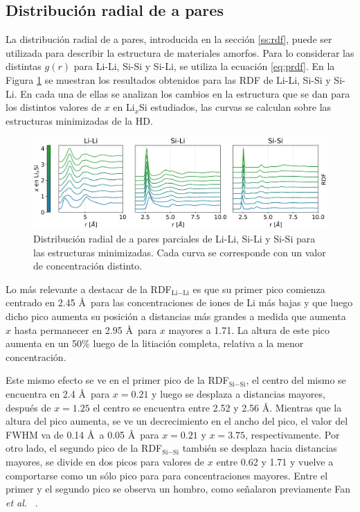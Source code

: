 \subsection{Distribución radial de a pares}

La distribución radial de a pares, introducida en la sección \ref{ss:rdf},
puede ser utilizada para describir la estructura de materiales amorfos. Para lo 
considerar las distintas $g(r)$ para Li-Li, Si-Si y Si-Li, se utiliza la 
ecuación \ref{eq:prdf}. En la Figura \ref{fig:rdf} se muestran los resultados 
obtenidos para las RDF de Li-Li, Si-Si y Si-Li. En cada una de ellas se analizan
los cambios en la estructura que se dan para los distintos valores de $x$ en 
Li$_x$Si estudiados, las curvas se calculan sobre las estructuras minimizadas 
de la HD.
\begin{figure}[h!]
    \centering
    \includegraphics[width=\textwidth]{Silicio/caracterizacion/resultados/rdf/rdf.png}
    \caption{Distribución radial de a pares parciales de Li-Li, Si-Li y Si-Si 
    para las estructuras minimizadas. Cada curva se corresponde con un valor de 
    concentración distinto.}
    \label{fig:rdf}
\end{figure}

Lo más relevante a destacar de la RDF$_{\text{Li}-\text{Li}}$ es que su primer 
pico comienza 
centrado en 2.45 \AA\ para las concentraciones de iones de Li más bajas y que 
luego dicho pico aumenta su posición a distancias más grandes a medida que aumenta
$x$ hasta permanecer en 2.95 \AA\ para $x$ mayores a 1.71. La altura de este pico
aumenta en un 50\% luego de la litiación completa, relativa a la menor 
concentración.

Este mismo efecto se ve en el primer pico de la RDF$_{\text{Si}-\text{Si}}$, el 
centro del mismo
se encuentra en 2.4 \AA\ para $x = 0.21$ y luego se desplaza a distancias
mayores, después de $x = 1.25$ el centro se encuentra entre 2.52 y 2.56 \AA.
Mientras que la altura del pico aumenta, se ve un decrecimiento en el ancho 
del pico, el valor del FWHM va de 0.14 \AA\ a 0.05 \AA\ para $x = 0.21$ y 
$x = 3.75$, respectivamente. Por otro lado, el segundo pico de la RDF$_{\text{Si}-\text{Si}}$
también se desplaza hacia distancias mayores, se divide en dos picos para valores 
de $x$ entre 0.62 y 1.71 y vuelve a comportarse como un sólo pico para para 
concentraciones mayores. Entre el primer y el segundo pico se observa un hombro,
como señalaron previamente Fan \textit{et al.} ~\cite{fan2013}.%

